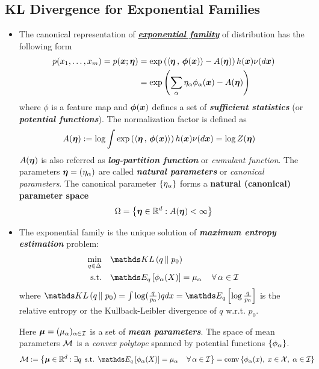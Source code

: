 \documentclass[11pt]{article}
\begin{document}
\subsection{KL Divergence for Exponential Families}
\begin{itemize}
\item The canonical representation of \underline{\emph{\textbf{exponential famlity}}} of distribution has the following form
\begin{align}
p(x_1, \ldots, x_{m}) = p(\boldsymbol{x}; \boldsymbol{\eta}) &= \exp\left(\left\langle \boldsymbol{\eta}\,,\, \boldsymbol{\phi}(\boldsymbol{x}) \right\rangle - A(\boldsymbol{\eta})\right)h(\boldsymbol{x})\nu(d\boldsymbol{x}) \nonumber \\
&= \exp\left(\sum_{\alpha}\eta_{\alpha}\phi_{\alpha}(\boldsymbol{x}) -  A(\boldsymbol{\eta})\right) \label{eqn: exp_fam}
\end{align} where $\phi$ is a feature map  and $\boldsymbol{\phi}(\boldsymbol{x})$ defines a set of \emph{\textbf{sufficient statistics}} (or \emph{\textbf{potential functions}}). The normalization factor is defined as
\begin{align*}
 A(\boldsymbol{\eta}) &:= \log \int \exp\left( \left\langle \boldsymbol{\eta}\,,\, \boldsymbol{\phi}(\boldsymbol{x}) \right\rangle \right)h(\boldsymbol{x})\nu(d\boldsymbol{x}) = \log Z(\boldsymbol{\eta})
\end{align*} $A(\boldsymbol{\eta})$ is also referred as \textbf{\emph{log-partition function}} or \emph{cumulant function}. The parameters $\boldsymbol{\eta} = (\eta_{\alpha})$ are called \textbf{\emph{natural parameters}}  or \emph{canonical parameters}. The canonical parameter $\left\{\eta_{\alpha}\right\}$ forms a \textbf{natural (canonical) parameter space}
\begin{align}
\Omega = \left\{\boldsymbol{\eta} \in {\mathbb R}^{d}: A(\boldsymbol{\eta}) < \infty\right\} \label{eqn: canonical_space}
\end{align}

\item The exponential family is the unique solution of \textbf{\emph{maximum entropy estimation}} problem:
\begin{align}
\min_{q \in \Delta}&\quad \kl{q}{p_{0}} \label{eqn: max_ent}\\
\text{s.t.}&\quad \E{q}{\phi_{\alpha}(X)} = \mu_{\alpha}\,\quad  \forall\, \alpha \in \cI   \label{eqn: max_ent_mean_constraint}
\end{align} where $\kl{q}{p_0} = \int \log(\frac{q}{p_0}) q dx = \E{q}{\log\frac{q}{p_0}}$ is the relative entropy or the Kullback-Leibler divergence of $q$ w.r.t. $p_0$.

Here $\boldsymbol{\mu} = (\mu_{\alpha})_{\alpha \in {\mathcal I}}$ is a set of  \textbf{\emph{mean parameters}}. The space of mean parameters ${\mathcal M}$ is a \emph{convex polytope} spanned by potential functions $\left\{\phi_{\alpha}\right\}$.
\begin{align}
\cM &:= \set{\mb{\mu} \in \bR^d: \exists q\,\; \text{s.t. } \E{q}{\phi_{\alpha}(X)} = \mu_{\alpha}\,\quad  \forall\, \alpha \in \cI} = \text{conv}\set{\phi_{\alpha}(x),\; x\in \cX, \;\alpha \in \cI}  \label{eqn: marginal_polytope}
\end{align}


\end{itemize}
\end{document}
